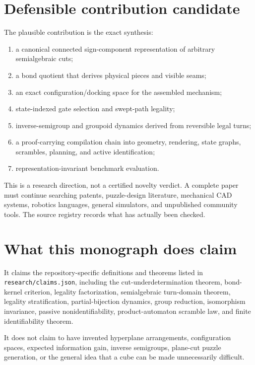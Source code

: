 \documentclass[11pt,openany]{book}
\theoremstyle{polyplain}
\theoremstyle{polydef}
\begin{document}
\section{Defensible contribution candidate}

The plausible contribution is the exact synthesis:
\begin{enumerate}
  \item a canonical connected sign-component representation of arbitrary semialgebraic cuts;
  \item a bond quotient that derives physical pieces and visible seams;
  \item an exact configuration/docking space for the assembled mechanism;
  \item state-indexed gate selection and swept-path legality;
  \item inverse-semigroup and groupoid dynamics derived from reversible legal turns;
  \item a proof-carrying compilation chain into geometry, rendering, state graphs, scrambles, planning, and active identification;
  \item representation-invariant benchmark evaluation.
\end{enumerate}

This is a research direction, not a certified novelty verdict. A complete paper must continue searching patents, puzzle-design literature, mechanical CAD systems, robotics languages, general simulators, and unpublished community tools. The source registry records what has actually been checked.

\section{What this monograph does claim}

It claims the repository-specific definitions and theorems listed in \texttt{research/claims.json}, including the cut-underdetermination theorem, bond-kernel criterion, legality factorization, semialgebraic turn-domain theorem, legality stratification, partial-bijection dynamics, group reduction, isomorphism invariance, passive nonidentifiability, product-automaton scramble law, and finite identifiability theorem.

It does not claim to have invented hyperplane arrangements, configuration spaces, expected information gain, inverse semigroups, plane-cut puzzle generation, or the general idea that a cube can be made unnecessarily difficult.
\end{document}

